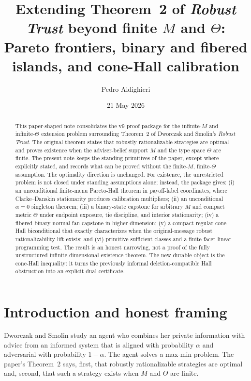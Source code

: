 \documentclass[11pt]{article}
\title{
  Extending Theorem~2 of \emph{Robust Trust} beyond finite $M$ and $\Theta$:\\
  \large Pareto frontiers, binary and fibered islands, and cone-Hall calibration
}
\author{Pedro Aldighieri}
\date{21 May 2026}
\theoremstyle{definition}
\theoremstyle{remark}
\begin{document}
\maketitle

\begin{abstract}
This paper-shaped note consolidates the v9 proof package for the infinite-$M$ and infinite-$\Theta$ extension problem surrounding Theorem~2 of Dworczak and Smolin's \emph{Robust Trust}. The original theorem states that robustly rationalizable strategies are optimal and proves existence when the adviser-belief support $M$ and the type space $\Theta$ are finite. The present note keeps the standing primitives of the paper, except where explicitly stated, and records what can be proved without the finite-$M$, finite-$\Theta$ assumption. The optimality direction is unchanged. For existence, the unrestricted problem is not closed under standing assumptions alone; instead, the package gives: (i) an unconditional finite-menu Pareto-Hall theorem in payoff-label coordinates, where Clarke--Danskin stationarity produces calibration multipliers; (ii) an unconditional $\alpha=0$ singleton theorem; (iii) a binary-state capstone for arbitrary $M$ and compact metric $\Theta$ under endpoint exposure, tie discipline, and interior stationarity; (iv) a fibered-binary-normal-fan capstone in higher dimension; (v) a compact-regular cone-Hall biconditional that exactly characterizes when the original-message robust rationalizability lift exists; and (vi) primitive sufficient classes and a finite-facet linear-programming test. The result is an honest narrowing, not a proof of the fully unstructured infinite-dimensional existence theorem. The new durable object is the cone-Hall inequality: it turns the previously informal deletion-compatible Hall obstruction into an explicit dual certificate.
\end{abstract}

\section{Introduction and honest framing}\label{sec:intro}

Dworczak and Smolin \cite{DworczakSmolin2026} study an agent who combines her private information with advice from an informed system that is aligned with probability $\alpha$ and adversarial with probability $1-\alpha$. The agent solves a max-min problem. The paper's Theorem~2 says, first, that robustly rationalizable strategies are optimal and, second, that such a strategy exists when $M$ and $\Theta$ are finite.
\end{document}
